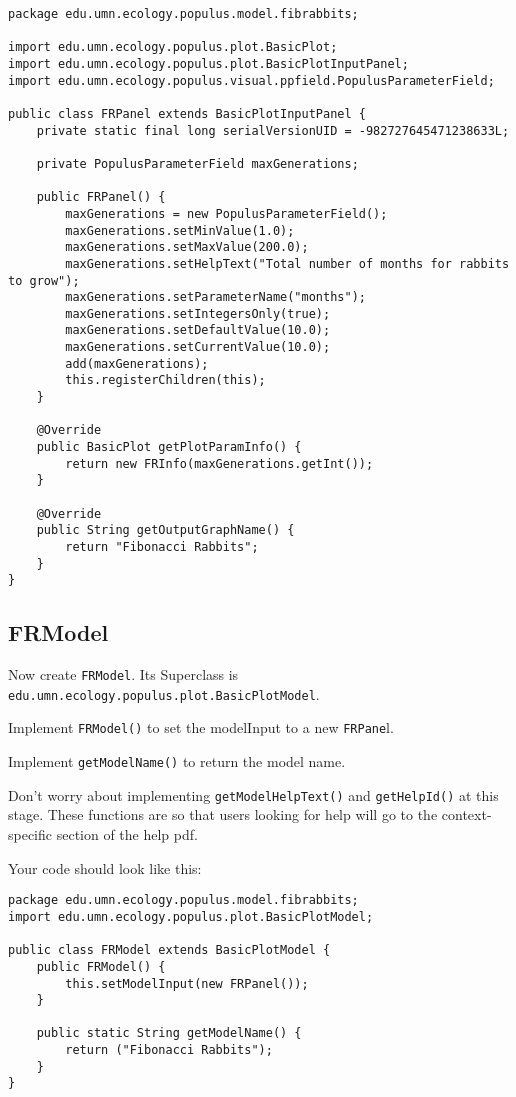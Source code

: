 \documentclass[12pt]{article}
\begin{document}
\begin{verbatim}
package edu.umn.ecology.populus.model.fibrabbits;

import edu.umn.ecology.populus.plot.BasicPlot;
import edu.umn.ecology.populus.plot.BasicPlotInputPanel;
import edu.umn.ecology.populus.visual.ppfield.PopulusParameterField;

public class FRPanel extends BasicPlotInputPanel {
    private static final long serialVersionUID = -982727645471238633L;

    private PopulusParameterField maxGenerations;
	
    public FRPanel() {
        maxGenerations = new PopulusParameterField();
        maxGenerations.setMinValue(1.0);
        maxGenerations.setMaxValue(200.0);
        maxGenerations.setHelpText("Total number of months for rabbits to grow");
        maxGenerations.setParameterName("months");
        maxGenerations.setIntegersOnly(true);
        maxGenerations.setDefaultValue(10.0);
        maxGenerations.setCurrentValue(10.0);
        add(maxGenerations);
        this.registerChildren(this);
    }
	
    @Override
    public BasicPlot getPlotParamInfo() {
        return new FRInfo(maxGenerations.getInt());
    }
	
    @Override
    public String getOutputGraphName() {
        return "Fibonacci Rabbits";
    }
}
\end{verbatim}



\subsection{FRModel}
Now create \texttt{FRModel}.  Its Superclass is \texttt{edu.umn.ecology.populus.plot.BasicPlotModel}.

Implement \texttt{FRModel()} to set the modelInput to a new \texttt{FRPane}l.

Implement \texttt{getModelName()} to return the model name.

Don't worry about implementing \texttt{getModelHelpText()} and \texttt{getHelpId()} at this stage.  These functions are so that users looking for help will go to the context-specific section of the help pdf.

Your code should look like this:

\begin{verbatim}
package edu.umn.ecology.populus.model.fibrabbits;
import edu.umn.ecology.populus.plot.BasicPlotModel;

public class FRModel extends BasicPlotModel {
    public FRModel() {
        this.setModelInput(new FRPanel());
    }

    public static String getModelName() {
        return ("Fibonacci Rabbits");
    }
}
\end{verbatim}
\end{document}
